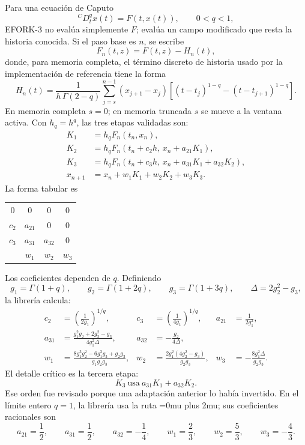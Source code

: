 \documentclass[11pt]{article}
\DeclareRobustCommand{\codepath}[1]{\begingroup\Urlmuskip=0mu plus 2mu\path{#1}\endgroup}
\begin{document}
Para una ecuación de Caputo
\[
{}^{C}D_t^q x(t)=F(t,x(t)),\qquad 0<q<1,
\]
EFORK-3 no evalúa simplemente \(F\); evalúa un campo modificado que resta la
historia conocida. Si el paso base es \(n\), se escribe
\[
F_n(t,z)=F(t,z)-H_n(t),
\]
donde, para memoria completa, el término discreto de historia usado por la
implementación de referencia tiene la forma
\[
H_n(t)=
\frac{1}{h\,\Gamma(2-q)}
\sum_{j=s}^{n-1}
(x_{j+1}-x_j)
\left[{\left(t-t_j\right)}^{1-q}-{\left(t-t_{j+1}\right)}^{1-q}\right].
\]
En memoria completa \(s=0\); en memoria truncada \(s\) se mueve a la ventana
activa. Con \(h_q=h^q\), las tres etapas validadas son:
\begin{align}
K_1 &= h_q F_n(t_n,x_n),\\
K_2 &= h_q F_n(t_n+c_2h,\,x_n+a_{21}K_1),\\
K_3 &= h_q F_n(t_n+c_3h,\,x_n+a_{31}K_1+a_{32}K_2),\\
x_{n+1} &= x_n+w_1K_1+w_2K_2+w_3K_3.
\label{eq:efork3_formula}
\end{align}
La forma tabular es
\begin{center}
\small
\begin{tabular}{cccc}
\toprule
0 & \(0\) & \(0\) & \(0\) \\
$c_2$ & $a_{21}$ & 0 & 0 \\
$c_3$ & $a_{31}$ & $a_{32}$ & 0 \\
\midrule
& $w_1$ & $w_2$ & $w_3$ \\
\bottomrule
\end{tabular}
\end{center}
Los coeficientes dependen de \(q\). Definiendo
\[
g_1=\Gamma(1+q),\qquad
g_2=\Gamma(1+2q),\qquad
g_3=\Gamma(1+3q),\qquad
\Delta=2g_2^2-g_3,
\]
la librería calcula:
\begin{align}
c_2 &= {\left(\frac{1}{2g_1}\right)}^{1/q},
&
c_3 &= {\left(\frac{1}{4g_1}\right)}^{1/q},
&
a_{21} &= \frac{1}{2g_1^2},
\\
a_{31} &=
\frac{g_1^2g_2+2g_2^2-g_3}{4g_1^2\Delta},
&
a_{32} &= -\frac{g_2}{4\Delta},
\\
w_1 &=
\frac{8g_1^3g_2^2-6g_1^3g_3+g_2g_3}{g_1g_2g_3},
&
w_2 &=
\frac{2g_1^2(4g_2^2-g_3)}{g_2g_3},
&
w_3 &=
-\frac{8g_1^2\Delta}{g_2g_3}.
\label{eq:efork3_coefficients}
\end{align}
El detalle crítico es la tercera etapa:
\[
K_3\ \text{usa}\ a_{31}K_1+a_{32}K_2.
\]
Ese orden fue revisado porque una adaptación anterior lo había invertido. En
el límite entero \(q=1\), la librería usa la ruta \codepath{efork_q1}; sus
coeficientes racionales son
\[
a_{21}=\frac{1}{2},\qquad
a_{31}=\frac{1}{2},\qquad
a_{32}=-\frac{1}{4},\qquad
w_1=\frac{2}{3},\qquad
w_2=\frac{5}{3},\qquad
w_3=-\frac{4}{3}.
\]
\end{document}
